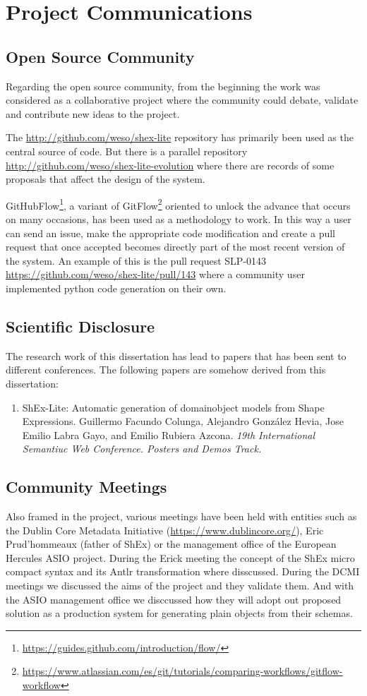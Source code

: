 \chapter{Project Communications}

\section{Open Source Community}
Regarding the open source community, from the beginning the work was considered as a
collaborative project where the community could debate, validate and contribute new
ideas to the project.

The \url{http://github.com/weso/shex-lite} repository has primarily been used as the central source of code. But
there is a parallel repository \url{http://github.com/weso/shex-lite-evolution} where there are records of some proposals that affect
the design of the system.

GitHubFlow\footnote{\url{https://guides.github.com/introduction/flow/}}, a variant of
GitFlow\footnote{\url{https://www.atlassian.com/es/git/tutorials/comparing-workflows/gitflow-workflow}} oriented to unlock the advance that occurs on many
occasions, has been used as a methodology to work. In this way a user can send an issue,
make the appropriate code modification and create a pull request that once accepted becomes
directly part of the most recent version of the system. An example of this is the
pull request SLP-0143 \url{https://github.com/weso/shex-lite/pull/143} where a community user implemented python code generation on
their own.

\section{Scientific Disclosure}
The research work of this dissertation has lead to papers that has been sent to different conferences.
The following papers are somehow derived from this dissertation:

\begin{enumerate}
    \item ShEx-Lite: Automatic generation of domainobject models from Shape Expressions.
    Guillermo Facundo Colunga, Alejandro González Hevia, Jose Emilio Labra Gayo, and Emilio Rubiera Azcona.
    \textit{19th International Semantiuc Web Conference. Posters and Demos Track.}
\end{enumerate}

\section{Community Meetings}
Also framed in the project, various meetings have been held with entities such as
the Dublin Core Metadata Initiative (\url{https://www.dublincore.org/}), Eric Prud'hommeaux (father of ShEx) or the management office of
the European Hercules ASIO project. During the Erick meeting the concept of the ShEx micro compact syntax and its Antlr transformation
where disscussed. During the DCMI meetings we discussed the aims of the project and they validate them. And with the ASIO management
office we disccussed how they will adopt out proposed solution as a production system for generating plain objects from their
schemas.
